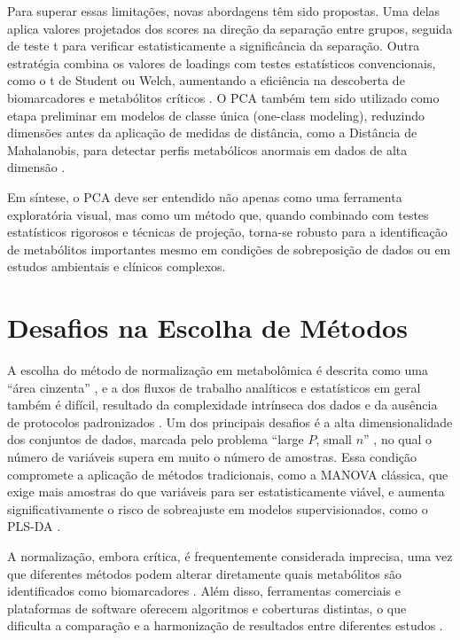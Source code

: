 Para superar essas limitações, novas abordagens têm sido propostas. Uma delas aplica valores projetados dos scores na direção da separação entre grupos, seguida de teste t para verificar estatisticamente a significância da separação. Outra estratégia combina os valores de loadings com testes estatísticos convencionais, como o t de Student ou Welch, aumentando a eficiência na descoberta de biomarcadores e metabólitos críticos \cite{mayonu2026evaluation}. O PCA também tem sido utilizado como etapa preliminar em modelos de classe única (one-class modeling), reduzindo dimensões antes da aplicação de medidas de distância, como a Distância de Mahalanobis, para detectar perfis metabólicos anormais em dados de alta dimensão \cite{brini2021improved}.

Em síntese, o PCA deve ser entendido não apenas como uma ferramenta exploratória visual, mas como um método que, quando combinado com testes estatísticos rigorosos e técnicas de projeção, torna-se robusto para a identificação de metabólitos importantes mesmo em condições de sobreposição de dados ou em estudos ambientais e clínicos complexos.


\section{\textbf{Desafios na Escolha de Métodos}}

A escolha do método de normalização em metabolômica é descrita como uma “área cinzenta” \cite{de2018normalizemets}, e a dos fluxos de trabalho analíticos e estatísticos em geral também é difícil, resultado da complexidade intrínseca dos dados e da ausência de protocolos padronizados \cite{wiedmer2013selection}. Um dos principais desafios é a alta dimensionalidade dos conjuntos de dados, marcada pelo problema “large $P$, small $n$” \cite{mayonu2026evaluation}, no qual o número de variáveis supera em muito o número de amostras. Essa condição compromete a aplicação de métodos tradicionais, como a MANOVA clássica, que exige mais amostras do que variáveis para ser estatisticamente viável, e aumenta significativamente o risco de sobreajuste em modelos supervisionados, como o PLS-DA \cite{perezcova2022comparison}.

A normalização, embora crítica, é frequentemente considerada imprecisa, uma vez que diferentes métodos podem alterar diretamente quais metabólitos são identificados como biomarcadores \cite{de2018normalizemets}. Além disso, ferramentas comerciais e plataformas de software oferecem algoritmos e coberturas distintas, o que dificulta a comparação e a harmonização de resultados entre diferentes estudos \cite{datanor,li2016performance}.

